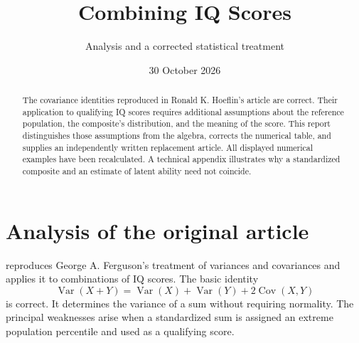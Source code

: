 \documentclass[
  a4paper,fontsize=11pt,parskip=half,headings=small,
  numbers=noenddot,bibliography=totoc
]{scrartcl}
\title{Combining IQ Scores}
\subtitle{Analysis and a corrected statistical treatment}
\author{}
\date{30 October 2026}
\DeclareMathOperator{\Var}{Var}
\begin{document}
\maketitle
\thispagestyle{plain.scrheadings}
\vspace{-1.1em}

\begin{abstract}
The covariance identities reproduced in Ronald K. Hoeflin's article are
correct. Their application to qualifying IQ scores requires additional
assumptions about the reference population, the composite's distribution,
and the meaning of the score. This report distinguishes those assumptions
from the algebra, corrects the numerical table, and supplies an independently
written replacement article. All displayed numerical examples have been
recalculated. A technical appendix illustrates why a standardized composite
and an estimate of latent ability need not coincide.
\end{abstract}

\section{Analysis of the original article}\label{sec:analysis}

\citet{hoeflin} reproduces George A. Ferguson's treatment of variances and
covariances and applies it to combinations of IQ scores. The basic identity
\begin{equation}
  \Var(X+Y)=\Var(X)+\Var(Y)+2\operatorname{Cov}(X,Y)
  \label{eq:variance-sum}
\end{equation}
is correct. It determines the variance of a sum without requiring normality.
The principal weaknesses arise when a standardized sum is assigned an extreme
population percentile and used as a qualifying score.
\end{document}
